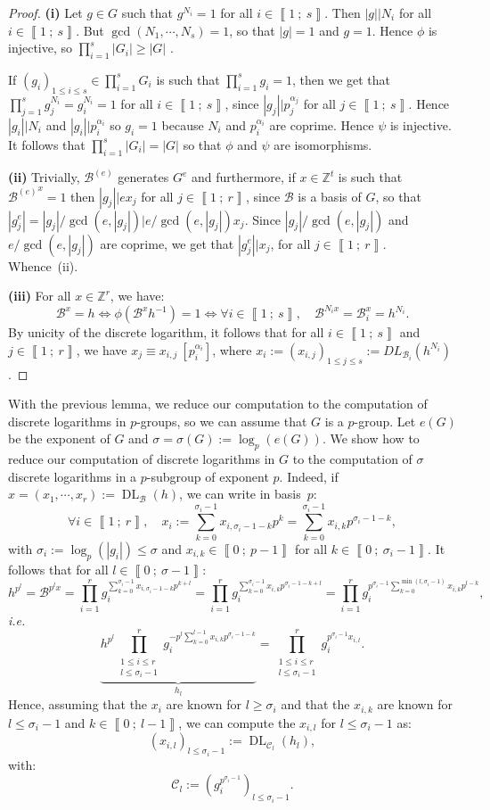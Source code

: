 \documentclass[a4paper,10pt,notitlepage]{report}
\theoremstyle{definition}
\theoremstyle{plain}
\theoremstyle{definition}
\newcommand{\ie}{\emph{i.e.}\ }
\newcommand{\Z}{\mathbb{Z}}
\newcommand{\m}[1]{\mathcal{#1}}
\newcommand{\mC}{\mathcal{C}}
\renewcommand{\i}[2]{\left\llbracket #1~;~#2\right\rrbracket}
\renewcommand{\(}{\left(}
\renewcommand{\)}{\right)}
\DeclareMathOperator{\DL}{DL}
\begin{document}
\begin{proof}
\textbf{(i)} Let $g\in G$ such that $g^{N_i}=1$ for all $i\in\i{1}{s}$. Then $|g||N_i$ for all $i\in\i{1}{s}$. But $\gcd(N_1,\cdots, N_s)=1$, so that $|g|=1$ and $g=1$. Hence $\phi$ is injective, so $\prod_{i=1}^s|G_i|\geq |G|$ .

If $(g_i)_{1\leq i\leq s} \in  \prod_{i=1}^s G_i$ is such that $\prod_{i=1}^s g_i=1$, then we get that $\prod_{j=1}^s g_j^{N_i}=g_i^{N_i}=1$ for all $i\in\i{1}{s}$,  since $|g_j||p_j^{\alpha_j}$ for all $j\in\i{1}{s}$.  Hence $|g_i||N_i$ and $|g_i||p_i^{\alpha_i}$ so $g_i=1$ because $N_i$ and $p_i^{\alpha_i}$ are coprime. Hence $\psi$ is injective. It follows that $\prod_{i=1}^s|G_i|=|G|$ so that $\phi$ and $\psi$ are isomorphisms.  

\textbf{(ii)} Trivially, $\m{B}^{(e)}$ generates $G^e$ and furthermore, if $x\in\Z^t$ is such that ${\m{B}^{(e)}}^x=1$ then $|g_j||e x_j$ for all $j\in\i{1}{r}$, since $\m{B}$ is a basis of $G$, so that $|g_j^{e}|=|g_j|/\gcd(e,|g_j|)|e/\gcd(e,|g_j|)x_j$. Since $|g_j|/\gcd(e,|g_j|)$ and $e/\gcd(e,|g_j|)$ are coprime, we get that $|g_j^{e}||x_j$, for all $j\in\i{1}{r}$. Whence~(ii).

\textbf{(iii)} For all $x\in\Z^r$, we have:
\[\m{B}^x=h\Longleftrightarrow \phi(\m{B}^xh^{-1})=1\Longleftrightarrow \forall i\in\i{1}{s}, \quad \m{B}^{N_i x}=\m{B}_i^x=h^{N_i}.\]
By unicity of the discrete logarithm, it follows that for all $i\in\i{1}{s}$ and $j\in\i{1}{r}$, we have $x_j\equiv x_{i,j}\ [p_i^{\alpha_i}]$, where $x_i:=(x_{i,j})_{1\leq j\leq s}:=DL_{\m{B}_i}(h^{N_i})$. 
\end{proof}

With the previous lemma, we reduce our computation to the computation of discrete logarithms in $p$-groups, so we can assume that $G$ is a $p$-group.  Let $e(G)$ be the exponent of $G$ and $\sigma=\sigma(G):=\log_p(e(G))$. We show how to reduce our computation of discrete logarithms in $G$ to the computation of $\sigma$ discrete logarithms in a $p$-subgroup of exponent $p$.  Indeed, if $x=(x_1,\cdots, x_r):=\DL_{\m{B}}(h)$, we can write in basis~$p$:
\[\forall i\in\i{1}{r}, \quad x_i:=\sum_{k=0}^{\sigma_i-1}x_{i,\sigma_i-1-k} p^k=\sum_{k=0}^{\sigma_i-1}x_{i,k} p^{\sigma_i-1-k},\]
with $\sigma_i:=\log_p(|g_i|)\leq \sigma$ and $x_{i,k}\in\i{0}{p-1}$ for all $k\in\i{0}{\sigma_i-1}$.  It follows that for all $l\in\i{0}{\sigma-1}$:
\[h^{p^{l}}=\m{B}^{p^l x}=\prod_{i=1}^r g_i^{\sum_{k=0}^{\sigma_i-1}x_{i,\sigma_i-1-k} p^{k+l}}=\prod_{i=1}^r g_i^{\sum_{k=0}^{\sigma_i-1}x_{i,k} p^{\sigma_i-1-k+l}}=\prod_{i=1}^r g_i^{p^{\sigma_i-1}\sum_{k=0}^{\min(l,\sigma_i-1)}x_{i,k} p^{l-k}},\]
\ie
\[\underbrace{h^{p^{l}}\prod_{\substack{1\leq i\leq r\\ l\leq \sigma_i-1}}^r g_i^{-p^l\sum_{k=0}^{l-1}x_{i,k}p^{\sigma_i-1-k}}}_{h_l}=\prod_{\substack{1\leq i\leq r\\ l\leq \sigma_i-1}}^r g_i^{p^{\sigma_i-1}x_{i,l}}.\]
Hence, assuming that the $x_i$ are known for $l\geq \sigma_i$ and that the $x_{i,k}$ are known for $l\leq \sigma_i-1$ and $k\in\i{0}{l-1}$, we can compute the $x_{i,l}$ for $l\leq \sigma_i-1$ as:
\[(x_{i,l})_{ l\leq \sigma_i-1}:=\DL_{\mC_l}(h_l),\]
with:
\[\mC_l:=(g_i^{p^{\sigma_i-1}})_{ l\leq \sigma_i-1}.\] 
\end{document}
